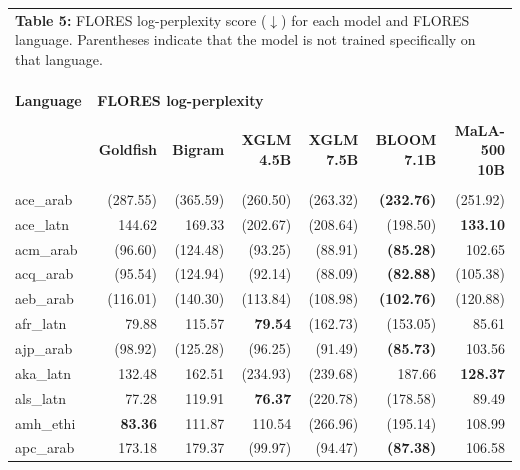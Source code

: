 \documentclass[11pt]{article}
\begin{document}
\onecolumn
\footnotesize
\begin{center}
\setlength\tabcolsep{0.1cm}
\begin{longtable}[width=0.9\textwidth]{|l|rrrrrr|}
\multicolumn{7}{p{0.75\textwidth}}{\textbf{Table 5:} FLORES log-perplexity score ($\downarrow$) for each model and FLORES language. Parentheses indicate that the model is not trained specifically on that language.} \\
\multicolumn{7}{l}{} \\
\hline
\vspace{-0.25cm} & & & & & & \\
\endfirsthead
\hline
\vspace{-0.25cm} & & & & & & \\
\endhead
\hline
\endfoot
\label{tab:ppl-table}
\textbf{Language} \phantom{\rule{0.1cm}{6pt}} & \multicolumn{6}{l|}{\textbf{FLORES log-perplexity}} \\
& & & & & & \\
& \textbf{Goldfish} & \textbf{Bigram} & \textbf{XGLM 4.5B} & \textbf{XGLM 7.5B} & \textbf{BLOOM 7.1B} & \textbf{MaLA-500 10B} \\
\hline
\vspace{-0.25cm} & & & & & & \\
ace\_arab & (287.55) & (365.59) & (260.50) & (263.32) & \textbf{(232.76)} & (251.92) \\ 
ace\_latn & 144.62 & 169.33 & (202.67) & (208.64) & (198.50) & \textbf{133.10} \\ 
acm\_arab & (96.60) & (124.48) & (93.25) & (88.91) & \textbf{(85.28)} & 102.65 \\ 
acq\_arab & (95.54) & (124.94) & (92.14) & (88.09) & \textbf{(82.88)} & (105.38) \\ 
aeb\_arab & (116.01) & (140.30) & (113.84) & (108.98) & \textbf{(102.76)} & (120.88) \\ 
afr\_latn & 79.88 & 115.57 & \textbf{79.54} & (162.73) & (153.05) & 85.61 \\ 
ajp\_arab & (98.92) & (125.28) & (96.25) & (91.49) & \textbf{(85.73)} & 103.56 \\ 
aka\_latn & 132.48 & 162.51 & (234.93) & (239.68) & 187.66 & \textbf{128.37} \\ 
als\_latn & 77.28 & 119.91 & \textbf{76.37} & (220.78) & (178.58) & 89.49 \\ 
amh\_ethi & \textbf{83.36} & 111.87 & 110.54 & (266.96) & (195.14) & 108.99 \\ 
apc\_arab & 173.18 & 179.37 & (99.97) & (94.47) & \textbf{(87.38)} & 106.58 \\ 

\end{longtable}
\end{center}
\end{document}
